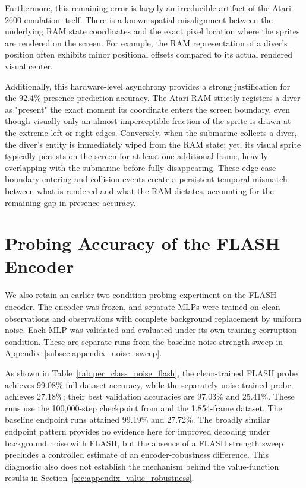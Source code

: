 \documentclass{article} %
\begin{document}
Furthermore, this remaining error is largely an irreducible artifact of the Atari 2600 emulation itself. There is a known spatial misalignment between the underlying RAM state coordinates and the exact pixel location where the sprites are rendered on the screen. For example, the RAM representation of a diver's position often exhibits minor positional offsets compared to its actual rendered visual center.

Additionally, this hardware-level asynchrony provides a strong justification for the $92.4\%$ presence prediction accuracy. The Atari RAM strictly registers a diver as "present" the exact moment its coordinate enters the screen boundary, even though visually only an almost imperceptible fraction of the sprite is drawn at the extreme left or right edges. Conversely, when the submarine collects a diver, the diver's entity is immediately wiped from the RAM state; yet, its visual sprite typically persists on the screen for at least one additional frame, heavily overlapping with the submarine before fully disappearing. These edge-case boundary entering and collision events create a persistent temporal mismatch between what is rendered and what the RAM dictates, accounting for the remaining gap in presence accuracy.


\onecolumn

\section{Probing Accuracy of the FLASH Encoder}
\label{sec:appendix_noise_robustness_flash}
We also retain an earlier two-condition probing experiment on the FLASH encoder. The encoder was frozen, and separate MLPs were trained on clean observations and observations with complete background replacement by uniform noise. Each MLP was validated and evaluated under its own training corruption condition. These are separate runs from the baseline noise-strength sweep in Appendix~\ref{subsec:appendix_noise_sweep}.

As shown in Table~\ref{tab:per_class_noise_flash}, the clean-trained FLASH probe achieves 99.08\% full-dataset accuracy, while the separately noise-trained probe achieves 27.18\%; their best validation accuracies are 97.03\% and 25.41\%. These runs use the 100,000-step checkpoint from \texttt{} and the 1,854-frame dataset. The baseline endpoint runs attained 99.19\% and 27.72\%. The broadly similar endpoint pattern provides no evidence here for improved decoding under background noise with FLASH, but the absence of a FLASH strength sweep precludes a controlled estimate of an encoder-robustness difference. This diagnostic also does not establish the mechanism behind the value-function results in Section~\ref{sec:appendix_value_robustness}.
\end{document}
